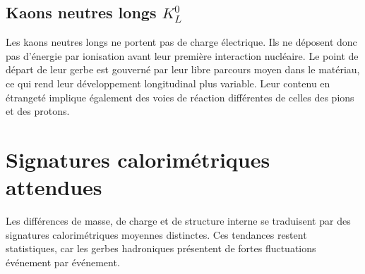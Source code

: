 \subsection{Kaons neutres longs \texorpdfstring{$K^0_L$}{KL0}}

Les kaons neutres longs ne portent pas de charge électrique. Ils ne déposent donc pas d'énergie par ionisation avant leur première interaction nucléaire. Le point de départ de leur gerbe est gouverné par leur libre parcours moyen dans le matériau, ce qui rend leur développement longitudinal plus variable. Leur contenu en étrangeté implique également des voies de réaction différentes de celles des pions et des protons.

\section{Signatures calorimétriques attendues}
\label{sec:comparaison-signatures}

Les différences de masse, de charge et de structure interne se traduisent par des signatures calorimétriques moyennes distinctes. Ces tendances restent statistiques, car les gerbes hadroniques présentent de fortes fluctuations événement par événement.

\begin{table}[!ht]
    \centering
    \caption{Comparaison qualitative des signatures calorimétriques moyennes attendues dans le SDHCAL.}
    \label{tab:comparaison-signatures}
    \renewcommand{\arraystretch}{1.4}
\end{table}

